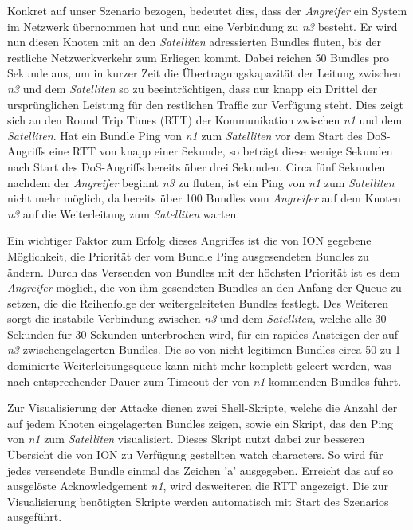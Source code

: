 \documentclass{article}
\begin{document}
Konkret auf unser Szenario bezogen, bedeutet dies, dass der \textit{Angreifer} ein System im Netzwerk übernommen hat und nun eine Verbindung zu \textit{n3} besteht. Er wird nun diesen Knoten mit an den \textit{Satelliten} adressierten Bundles fluten, bis  der restliche Netzwerkverkehr zum Erliegen kommt. Dabei reichen 50 Bundles pro Sekunde aus, um in kurzer Zeit die Übertragungskapazität der Leitung zwischen \textit{n3} und dem \textit{Satelliten} so zu beeinträchtigen, dass nur knapp ein Drittel der ursprünglichen Leistung für den restlichen Traffic zur Verfügung steht. Dies zeigt sich an den Round Trip Times (RTT) der Kommunikation zwischen \textit{n1} und dem \textit{Satelliten}. Hat ein Bundle Ping von \textit{n1} zum \textit{Satelliten} vor dem Start des DoS-Angriffs eine RTT von knapp einer Sekunde, so beträgt diese wenige Sekunden nach Start des DoS-Angriffs bereits über drei Sekunden. Circa fünf Sekunden nachdem der \textit{Angreifer} beginnt \textit{n3} zu fluten, ist ein Ping von \textit{n1} zum \textit{Satelliten} nicht mehr möglich, da bereits über 100 Bundles vom \textit{Angreifer} auf dem Knoten \textit{n3} auf die Weiterleitung zum \textit{Satelliten} warten.\par
Ein wichtiger Faktor zum Erfolg dieses Angriffes ist die von ION gegebene Möglichkeit, die Priorität der vom Bundle Ping ausgesendeten Bundles zu ändern. Durch das Versenden von Bundles mit der höchsten Priorität ist es dem \textit{Angreifer} möglich, die von ihm gesendeten Bundles an den Anfang der Queue zu setzen, die die Reihenfolge der weitergeleiteten Bundles festlegt. Des Weiteren sorgt die instabile Verbindung zwischen \textit{n3} und dem \textit{Satelliten}, welche alle 30 Sekunden für 30 Sekunden unterbrochen wird, für ein rapides Ansteigen der auf \textit{n3} zwischengelagerten Bundles. Die so von nicht legitimen Bundles circa 50 zu 1 dominierte Weiterleitungsqueue kann nicht mehr komplett geleert werden, was nach entsprechender Dauer zum Timeout der von \textit{n1} kommenden Bundles führt. \par
Zur Visualisierung der Attacke dienen zwei Shell-Skripte, welche die Anzahl der auf jedem Knoten eingelagerten Bundles zeigen, sowie ein Skript, das den Ping von \textit{n1} zum \textit{Satelliten} visualisiert. Dieses Skript nutzt dabei zur besseren Übersicht die von ION zu Verfügung gestellten watch characters. So wird für jedes versendete Bundle einmal das Zeichen 'a' ausgegeben. Erreicht das auf so ausgelöste Acknowledgement \textit{n1}, wird desweiteren die RTT angezeigt. Die zur Visualisierung benötigten Skripte werden automatisch mit Start des Szenarios ausgeführt.
\end{document}
